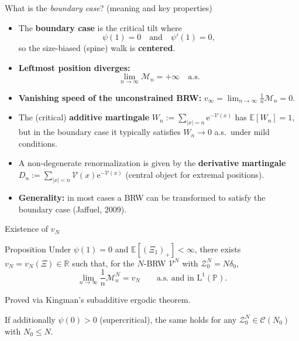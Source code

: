 \documentclass[10pt, aspectratio=169]{beamer}
\newcommand{\R}{\mathbb{R}}
\newcommand{\E}{\mathbb{E}}
\renewcommand{\P}{\mathbb{P}}
\newcommand{\e}{\mathrm{e}}
\begin{document}
\begin{frame}{What is the \emph{boundary case}? (meaning and key properties)}
    \small
    \begin{itemize}
        \item The \textbf{boundary case} is the critical tilt where
        \[
            \psi(1)=0
            \quad\text{and}\quad
            \psi'(1)=0,
        \]
        so the size-biased (spine) walk is \textbf{centered}.
        \item \textbf{Leftmost position diverges:}
        \[
            \lim_{n\to\infty}\mathcal M_n = +\infty
            \quad\text{a.s.}
        \]
        \item \textbf{Vanishing speed of the unconstrained BRW:} $v_\infty = \lim_{n\to\infty}\frac{1}{n}\mathcal M_n = 0$.
        \item The (critical) \textbf{additive martingale} $W_n:=\sum_{|x|=n}\e^{-\mathcal V(x)}$ has $\E[W_n]=1$,
        but in the boundary case it typically satisfies $W_n\to 0$ a.s.\ under mild conditions.
        \item A non-degenerate renormalization is given by the \textbf{derivative martingale}
        $D_n:=\sum_{|x|=n}\mathcal V(x)\e^{-\mathcal V(x)}$ (central object for extremal positions).
        \item \textbf{Generality:} in most cases a BRW can be transformed to satisfy the boundary case (Jaffuel, 2009).
    \end{itemize}
\end{frame}

\begin{frame}{Existence of $v_N$}
    \small
    \begin{block}{Proposition}
        Under $\psi(1)=0$ and $\E[(\Xi_1)_+]<\infty$, there exists $v_N=v_N(\Xi)\in\R$ such that,
        for the $N$-BRW $\mathcal V^N$ with $\mathcal Z^N_0=N\delta_0$,
        \[
            \lim_{n\to\infty}\frac{1}{n}\mathcal M^N_n = v_N
            \qquad\text{a.s.\ and in }\mathrm L^1(\P).
        \]
    \end{block}
    {\small Proved via Kingman's subadditive ergodic theorem.}
    \vspace{1mm}
    \begin{corollary}
        If additionally $\psi(0)>0$ (supercritical), the same holds for any $\mathcal Z^N_0\in\mathcal C(N_0)$ with $N_0\le N$.
    \end{corollary}
\end{frame}
\end{document}
